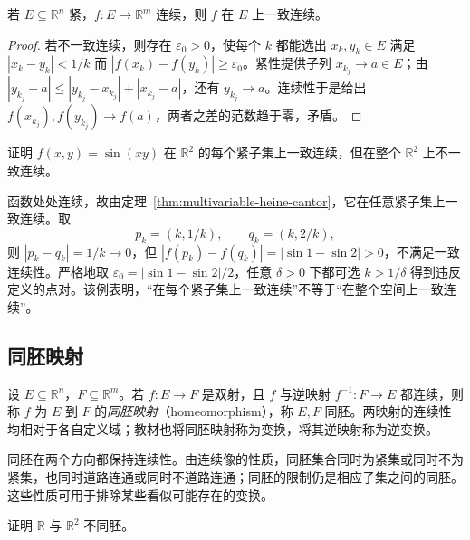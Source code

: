 \documentclass[UTF8,12pt,a4paper,fontset=fandol]{ctexbook}
\begin{document}
\begin{theorem}[紧集上的一致连续性]
\label{thm:multivariable-heine-cantor}
若 $E\subseteq\mathbb R^n$ 紧，$f:E\to\mathbb R^m$ 连续，则 $f$ 在 $E$ 上一致连续。
\end{theorem}

\begin{proof}
若不一致连续，则存在 $\varepsilon_0>0$，使每个 $k$ 都能选出 $x_k,y_k\in E$ 满足 $|x_k-y_k|<1/k$ 而 $|f(x_k)-f(y_k)|\geq\varepsilon_0$。紧性提供子列 $x_{k_j}\to a\in E$；由 $|y_{k_j}-a|\leq|y_{k_j}-x_{k_j}|+|x_{k_j}-a|$，还有 $y_{k_j}\to a$。连续性于是给出 $f(x_{k_j}),f(y_{k_j})\to f(a)$，两者之差的范数趋于零，矛盾。
\end{proof}

\begin{example}
\label{ex:sine-product-not-uniformly-continuous}
证明 $f(x,y)=\sin(xy)$ 在 $\mathbb R^2$ 的每个紧子集上一致连续，但在整个 $\mathbb R^2$ 上不一致连续。
\end{example}

\begin{solve}
函数处处连续，故由定理~\ref{thm:multivariable-heine-cantor}，它在任意紧子集上一致连续。取
\[
    p_k=(k,1/k),\qquad q_k=(k,2/k),
\]
则 $|p_k-q_k|=1/k\to0$，但 $|f(p_k)-f(q_k)|=|\sin1-\sin2|>0$，不满足一致连续性。严格地取 $\varepsilon_0=|\sin1-\sin2|/2$，任意 $\delta>0$ 下都可选 $k>1/\delta$ 得到违反定义的点对。该例表明，“在每个紧子集上一致连续”不等于“在整个空间上一致连续”。
\end{solve}

\subsection{同胚映射}
\label{subsec:homeomorphisms}

\begin{definition}
\label{def:euclidean-homeomorphism}
设 $E\subseteq\mathbb R^n$，$F\subseteq\mathbb R^m$。若 $f:E\to F$ 是双射，且 $f$ 与逆映射 $f^{-1}:F\to E$ 都连续，则称 $f$ 为 $E$ 到 $F$ 的\emph{同胚映射}（homeomorphism），称 $E,F$ 同胚。两映射的连续性均相对于各自定义域；教材也将同胚映射称为变换，将其逆映射称为逆变换。
\end{definition}

同胚在两个方向都保持连续性。由连续像的性质，同胚集合同时为紧集或同时不为紧集，也同时道路连通或同时不道路连通；同胚的限制仍是相应子集之间的同胚。这些性质可用于排除某些看似可能存在的变换。

\begin{example}
\label{ex:real-line-plane-not-homeomorphic}
证明 $\mathbb R$ 与 $\mathbb R^2$ 不同胚。
\end{example}
\end{document}
